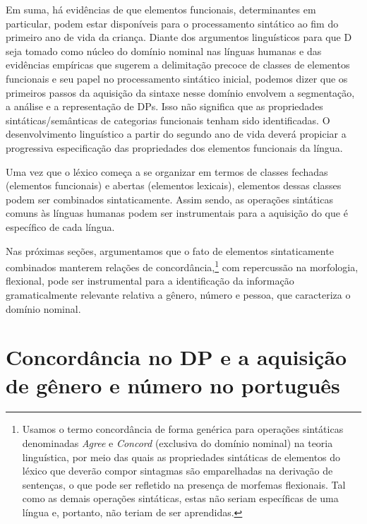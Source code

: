 \documentclass[output=paper]{LSP/langsci}
\begin{document}
Em suma, há evidências de que elementos funcionais, determinantes em particular, podem estar disponíveis para o processamento sintático ao fim do primeiro ano de vida da criança. Diante dos argumentos linguísticos para que D seja tomado como núcleo do domínio nominal nas línguas humanas e das evidências empíricas que sugerem a delimitação precoce de classes de elementos funcionais e seu papel no processamento sintático inicial, podemos dizer que os primeiros passos da aquisição da sintaxe nesse domínio envolvem a segmentação, a análise e a representação de DPs. Isso não significa que as propriedades sintáticas/semânticas de categorias funcionais tenham sido identificadas. O desenvolvimento linguístico a partir do segundo ano de vida deverá propiciar a progressiva especificação das propriedades dos elementos funcionais da língua. 

Uma vez que o léxico começa a se organizar em termos de classes fechadas (elementos funcionais) e abertas (elementos lexicais), elementos dessas classes podem ser combinados sintaticamente. Assim sendo, as operações sintáticas comuns às línguas humanas podem ser instrumentais para a aquisição do que é específico de cada língua. 

Nas próximas seções, argumentamos que o fato de elementos sintaticamente combinados manterem relações de concordância,\footnote{Usamos o termo concordância de forma genérica para operações sintáticas denominadas \textit{Agree} e \textit{Concord} (exclusiva do domínio nominal) na teoria linguística, por meio das quais as propriedades sintáticas de elementos do léxico que deverão compor sintagmas são emparelhadas na derivação de sentenças, o que pode ser refletido na presença de morfemas flexionais. Tal como as demais operações sintáticas, estas não seriam específicas de uma língua e, portanto, não teriam de ser aprendidas.} com repercussão na morfologia, flexional, pode ser instrumental para a identificação da informação gramaticalmente relevante relativa a gênero, número e pessoa, que caracteriza o domínio nominal.

\section{Concordância no DP e a aquisição de gênero e número no português}
\label{sec:correanp_concord}
\end{document}
